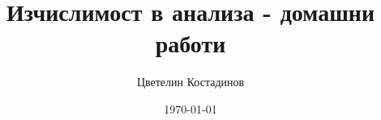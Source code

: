 \newif\ifnotes


\ifnotes
    \title{Изчислимост в анализа - сега сметаемо ли е или не е}
    \date{2024-02-28}
\else 
    \title{Изчислимост в анализа - домашни работи}
    \date{\today}
\fi

\author{
  Цветелин Костадинов
}